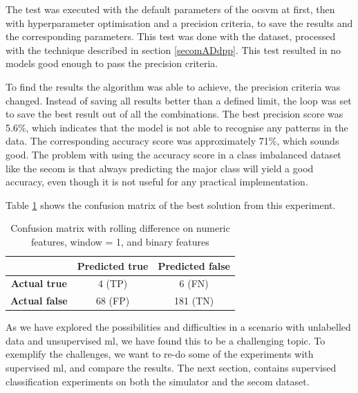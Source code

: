 \documentclass[english, a4paper]{report}
\begin{document}
{{{            The test was executed with the default parameters of  the \gls{ocsvm} at first, then with hyperparameter optimisation and a precision criteria, to save the results and the corresponding parameters. This test was done with the dataset, processed with the technique described in section \ref{secomADdpp}. This test resulted in no models good enough to pass the precision criteria.
            \par
            To find the results the algorithm was able to achieve, the precision criteria was changed. Instead of saving all results better than a defined limit, the loop was set to save the best result out of all the combinations. The best precision score was 5.6\%, which indicates that the model is not able to recognise any patterns in the data. The corresponding accuracy score was approximately 71\%, which sounds good. The problem with using the accuracy score in a class imbalanced dataset like the \gls{secom} is that always predicting the major class will yield a good accuracy, even though it is not useful for any practical implementation.
            \par
            Table \ref{simu-confusion} shows the confusion matrix of the best solution from this experiment. 
            \begin{table}[H]
                \centering
                \begin{tabular}{|c|c|c|}
                     \hline
                     \textbf{} & \textbf{Predicted true} & \textbf{Predicted false} \\ \hline
                     \textbf{Actual true} &  4 (TP) & 6 (FN)\\ \hline
                     \textbf{Actual false} & 68 (FP) & 181 (TN)\\ \hline
                \end{tabular}
                \caption{Confusion matrix with rolling difference on numeric features, window = 1, and binary features}
                \label{simu-confusion}
            \end{table}
                        
        }
        
        As we have explored the possibilities and difficulties in a scenario with unlabelled data and unsupervised \gls{ml}, we have found this to be a challenging topic. To exemplify the challenges, we want to re-do some of the experiments with supervised \gls{ml}, and compare the results. The next section, contains supervised classification experiments on both the simulator and the \gls{secom} dataset.
    }

}
\end{document}
